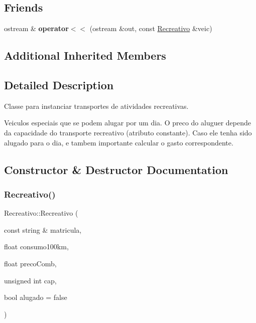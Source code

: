 \subsection*{Friends}
\begin{DoxyCompactItemize}
\item 
\mbox{\label{class_recreativo_a207796b1dc2e32b04fb075791f87e193}} 
ostream \& {\bfseries operator$<$$<$} (ostream \&out, const \mbox{\hyperlink{class_recreativo}{Recreativo}} \&veic)
\end{DoxyCompactItemize}
\subsection*{Additional Inherited Members}


\subsection{Detailed Description}
Classe para instanciar transportes de atividades recreativas. 

Veiculos especiais que se podem alugar por um dia. O preco do aluguer depende da capacidade do transporte recreativo (atributo constante). Caso ele tenha sido alugado para o dia, e tambem importante calcular o gasto correspondente. 

\subsection{Constructor \& Destructor Documentation}
\mbox{\label{class_recreativo_aa931f6746a37e943b28387afed12ba34}} 
\subsubsection{\texorpdfstring{Recreativo()}{Recreativo()}}
{\footnotesize\ttfamily Recreativo\+::\+Recreativo (\begin{DoxyParamCaption}\item[{const string \&}]{matricula,  }\item[{float}]{consumo100km,  }\item[{float}]{preco\+Comb,  }\item[{unsigned int}]{cap,  }\item[{bool}]{alugado = {\ttfamily false} }\end{DoxyParamCaption})}



